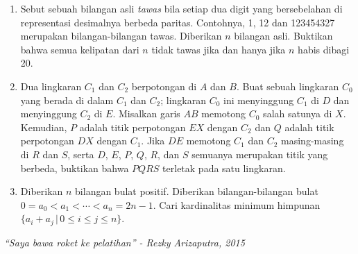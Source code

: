 \documentclass{article}
\begin{document}
	\begin{enumerate}
		\item Sebut sebuah bilangan asli \textit{tawas} bila setiap dua digit yang bersebelahan di representasi desimalnya berbeda paritas. Contohnya, 1, 12 dan 123454327 merupakan bilangan-bilangan tawas. Diberikan $n$ bilangan asli. Buktikan bahwa semua kelipatan dari $n$ tidak tawas jika dan hanya jika $n$ habis dibagi 20.
		\item Dua lingkaran $C_1$ dan $C_2$ berpotongan di $A$ dan $B$. Buat sebuah lingkaran $C_0$ yang berada di dalam $C_1$ dan $C_2$; lingkaran $C_0$ ini menyinggung $C_1$ di $D$ dan menyinggung $C_2$ di $E$. Misalkan garis $AB$ memotong $C_0$ salah satunya di $X$. Kemudian, $P$ adalah titik perpotongan $EX$ dengan $C_2$ dan $Q$ adalah titik perpotongan $DX$ dengan $C_1$. Jika $DE$ memotong $C_1$ dan $C_2$ masing-masing di $R$ dan $S$, serta $D$, $E$, $P$, $Q$, $R$, dan $S$ semuanya merupakan titik yang berbeda, buktikan bahwa $PQRS$ terletak pada satu lingkaran.
		\item Diberikan $n$ bilangan bulat positif. Diberikan bilangan-bilangan bulat $0 = a_0 < a_1 < \dotsb < a_n = 2n - 1$. Cari kardinalitas minimum himpunan $\{ a_i + a_j \, | \, 0 \le i \le j \le n \}$.
	\end{enumerate}
	\begin{center}
		\textit{``Saya bawa roket ke pelatihan'' - Rezky Arizaputra, 2015}
	\end{center}
\end{document}
